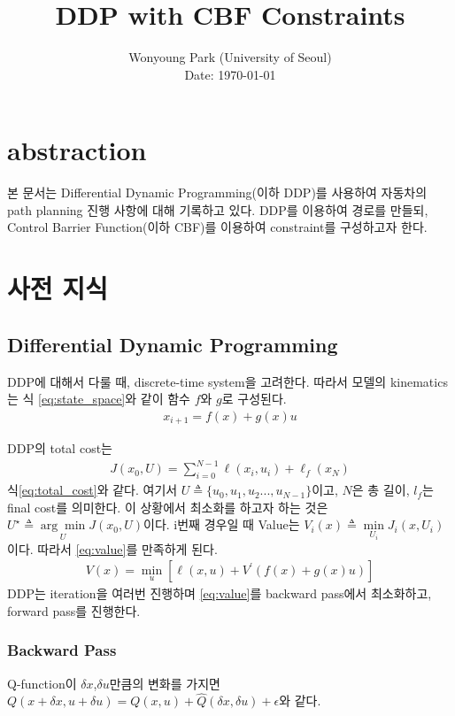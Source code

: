 \documentclass[journal]{IEEEtran}
\begin{document}
	
	\title{DDP with CBF Constraints}
	
	\author{Wonyoung Park (University of Seoul)\\ 
		Date: \today
	}
	
	\maketitle
	
	\section{abstraction}
	본 문서는 Differential Dynamic Programming(이하 DDP)를 사용하여 자동차의 path planning 진행 사항에 대해 기록하고 있다. DDP를 이용하여 경로를 만들되, Control Barrier Function(이하 CBF)를 이용하여 constraint를 구성하고자 한다. 
	
	\section{사전 지식}
	\subsection{Differential Dynamic Programming}
	DDP에 대해서 다룰 때, discrete-time system을 고려한다. 따라서 모델의 kinematics는 {식 \eqref{eq:state_space}}와 같이 {함수 $f$와 $g$}로 구성된다.
	\begin{align}
		x_{i+1}=f(x)+g(x)u
		\label{eq:state_space}
	\end{align}
	
	DDP의 total cost는
	\begin{align}
		J(x_0,U)=\sum_{i=0}^{N-1} \ell(x_i,u_i)+\ell_f(x_N)
		\label{eq:total_cost}
	\end{align}
	식\eqref{eq:total_cost}와 같다. 여기서 $U \triangleq \{u_0,u_1,u_2...,u_{N-1}\}$이고, $ N$은 총 길이, $l_f$는 final cost를 의미한다.
	이 상황에서 최소화를 하고자 하는 것은 $U^{\star}\triangleq\underset{U}{\arg\min} J(x_0,U)$이다.
	i번째 경우일 때 Value는 $V_i(x)\triangleq \underset{U_i}{\min}J_i(x,U_i)$이다. 따라서 \eqref{eq:value}를 만족하게 된다.
	\begin{align}
		V(x)=\underset{u}{\min}[\ell(x,u)+V^{\prime}(f(x)+g(x)u)]
		\label{eq:value}
	\end{align}
	DDP는 iteration을 여러번 진행하며 \eqref{eq:value}를 backward pass에서 최소화하고, forward pass를 진행한다.
	
	\subsubsection{Backward Pass}
	Q-function이 $\delta x$,$\delta u$만큼의 변화를 가지면 $Q(x+\delta x,u+\delta u)=Q(x,u)+\hat{Q}(\delta x,\delta u)+\epsilon$와 같다.
	
\end{document}
